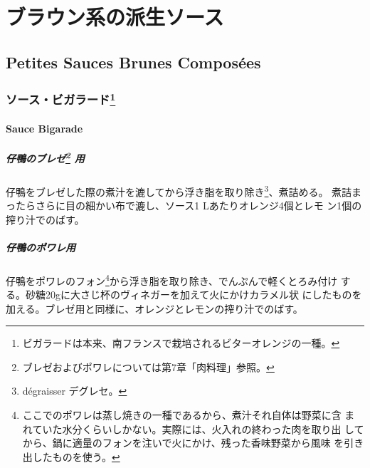 \hypertarget{ux30d6ux30e9ux30a6ux30f3ux7cfbux306eux6d3eux751fux30bdux30fcux30b9}{%
\section{ブラウン系の派生ソース}\label{ux30d6ux30e9ux30a6ux30f3ux7cfbux306eux6d3eux751fux30bdux30fcux30b9}}

\hypertarget{petites-sauces-brunes-composuxe9es}{%
\subsection{Petites Sauces Brunes
Composées}\label{petites-sauces-brunes-composuxe9es}}

\maeaki

\hypertarget{ux30bdux30fcux30b9ux30d3ux30acux30e9ux30fcux30c91}{%
\subsubsection[ソース・ビガラード]{\texorpdfstring{ソース・ビガラード\footnote{ビガラードは本来、南フランスで栽培されるビターオレンジの一種。}}{ソース・ビガラード}}\label{ux30bdux30fcux30b9ux30d3ux30acux30e9ux30fcux30c91}}

\hypertarget{sauce-bigarade}{%
\paragraph{Sauce Bigarade}\label{sauce-bigarade}}

  

\hypertarget{ux4ed4ux9d28ux306eux30d6ux30ecux30bc2-ux7528}{%
\subparagraph[仔鴨のブレゼ 用]{\texorpdfstring{仔鴨のブレゼ\footnote{ブレゼおよびポワレについては第7章「肉料理」参照。}
用}{仔鴨のブレゼ 用}}\label{ux4ed4ux9d28ux306eux30d6ux30ecux30bc2-ux7528}}

仔鴨をブレゼした際の煮汁を漉してから浮き脂を取り除き\footnote{dégraisser
  デグレセ。}、煮詰める。 煮詰まったらさらに目の細かい布で漉し、ソース1
Lあたりオレンジ4個とレモ ン1個の搾り汁でのばす。

\hypertarget{ux4ed4ux9d28ux306eux30ddux30efux30ecux7528}{%
\subparagraph{仔鴨のポワレ用}\label{ux4ed4ux9d28ux306eux30ddux30efux30ecux7528}}

仔鴨をポワレのフォン\footnote{ここでのポワレは蒸し焼きの一種であるから、煮汁それ自体は野菜に含
  まれていた水分くらいしかない。実際には、火入れの終わった肉を取り出
  してから、鍋に適量のフォンを注いで火にかけ、残った香味野菜から風味
  を引き出したものを使う。}から浮き脂を取り除き、でんぷんで軽くとろみ付け
する。砂糖20gに大さじ\undemi{}杯のヴィネガーを加えて火にかけカラメル状
にしたものを加える。ブレゼ用と同様に、オレンジとレモンの搾り汁でのばす。

